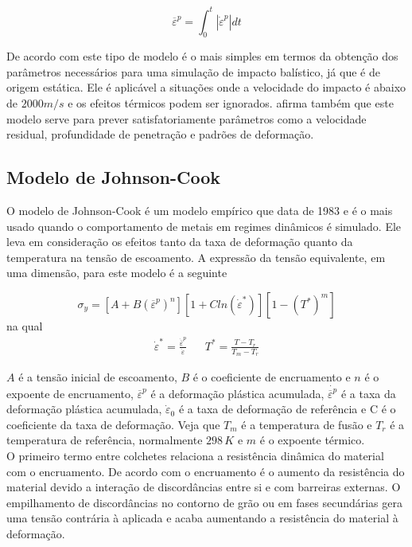 \begin{equation} \label{eq:defplastacu}
    \overline{\varepsilon}^p = \int_0^t |\dot{\varepsilon}^p| dt
\end{equation}

De acordo com \cite{rao_narayanamurthy_simha_2016} este tipo de modelo é o mais simples em termos da obtenção dos parâmetros necessários para uma simulação de impacto balístico, já que é de origem estática. Ele é aplicável a situações onde a velocidade do impacto é abaixo de $2000 m/s$ e os efeitos térmicos podem ser ignorados. \cite{rao_narayanamurthy_simha_2016} afirma também que este modelo serve para prever satisfatoriamente
 parâmetros como a velocidade residual, profundidade de penetração e padrões de deformação.
 
 \subsection{Modelo de Johnson-Cook}
 
 O modelo de Johnson-Cook é um modelo empírico que data de 1983 e é o mais usado quando o comportamento de metais em regimes dinâmicos é simulado. Ele leva em consideração os efeitos tanto da taxa de deformação quanto da temperatura na tensão de escoamento. A expressão da tensão equivalente, em uma dimensão, para este modelo é a seguinte
 
 \begin{equation}
     \sigma_y = [A + B (\overline{\varepsilon}^p)^n][1 + C ln(\dot{\varepsilon}^*)][1-(T^*)^m]
\end{equation}
 na qual 
\begin{align}
     \dot{\varepsilon}^* = \frac{\dot{\overline{\varepsilon}}^p}{\dot{\varepsilon}} &&
     T^* = \frac{T-T_r}{T_m-T_r}
 \end{align}
 
 $A$ é a tensão inicial de escoamento, $ B $ é o coeficiente de encruamento e $ n $ é o expoente de encruamento, $ \overline{\varepsilon}^p $ é a deformação plástica acumulada,  $\dot{ \overline{\varepsilon}^p} $  é a taxa da deformação plástica acumulada, $ \dot{\varepsilon}_0 $ é a taxa de deformação de referência e C é o coeficiente da taxa de deformação. Veja que $ T_m $ é a temperatura de fusão e $ T_r $ 
é a temperatura de referência, normalmente $ 298 \, K $ e $ m $ é o expoente térmico. \\

O primeiro termo entre colchetes relaciona a resistência dinâmica do material com o encruamento. De acordo com \cite{Crouch} o encruamento é o aumento da resistência do material devido a interação de discordâncias entre si e com barreiras externas. O empilhamento de discordâncias no contorno de grão ou em fases secundárias gera uma tensão contrária à aplicada e acaba aumentando a 
resistência do material à deformação. \\

